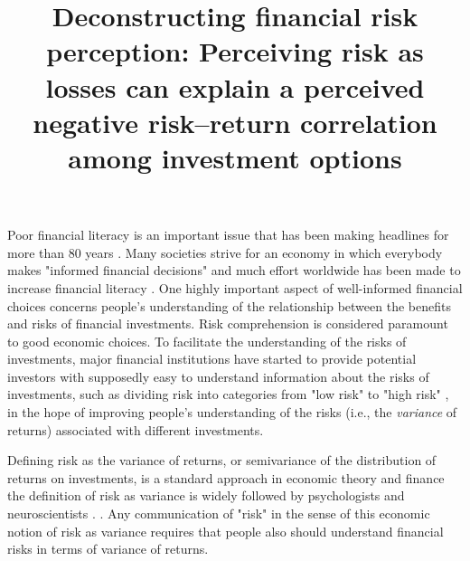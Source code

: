 \documentclass[a4paper,man, natbib,floatsintext]{apa6} %
\title{Deconstructing financial risk perception: Perceiving risk as losses can explain a perceived negative risk--return correlation among investment options}
\affiliation{University of Basel}
\begin{document}
\maketitle
%
%
Poor financial literacy is an important issue that has been making headlines for more than 80 years \citep{carrns2019,nyt1939}. Many societies strive for an economy in which everybody makes "informed financial decisions" \citep[][p. 6]{FinancialLitear2011} and much effort worldwide has been made to increase financial literacy \citep{OECD2019}. One highly important aspect of well-informed financial choices concerns people's understanding of the relationship between the benefits and risks of financial investments. Risk comprehension is considered paramount to good economic choices. To facilitate the understanding of the risks of investments, major financial institutions have started to provide potential investors with supposedly easy to understand information about the risks of investments, such as dividing risk into categories from "low risk" to "high risk" \citep[e.g., ][]{postfinance2019}, in the hope of improving people's understanding of the risks (i.e., the \textit{variance} of returns) associated with different investments.

Defining risk as the variance of returns, or semivariance of the distribution of returns on investments, is a standard approach in economic theory and finance   the definition of risk as variance is widely followed by psychologists and neuroscientists \citep[e.g.,][]{Nosic2010, Coombs1960, Mishra2016,Rushworth2008, Preuschoff2006, Fujimoto2016}. .  Any communication of "risk" in the sense of this economic notion of risk as variance requires that people also should understand financial risks in terms of variance of returns.
\end{document}

